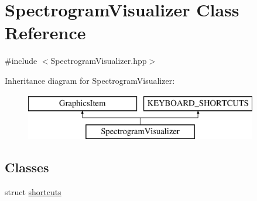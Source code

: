 \hypertarget{structSpectrogramVisualizer}{}\section{Spectrogram\+Visualizer Class Reference}
\label{structSpectrogramVisualizer}


{\ttfamily \#include $<$Spectrogram\+Visualizer.\+hpp$>$}

Inheritance diagram for Spectrogram\+Visualizer\+:\begin{figure}[H]
\begin{center}
\leavevmode
\includegraphics[height=2.000000cm]{structSpectrogramVisualizer}
\end{center}
\end{figure}
\subsection*{Classes}
\begin{DoxyCompactItemize}
\item 
struct \hyperlink{structSpectrogramVisualizer_1_1shortcuts}{shortcuts}
\end{DoxyCompactItemize}
